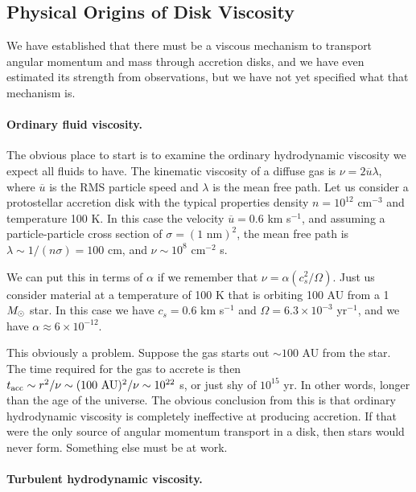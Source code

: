 \subsection{Physical Origins of Disk Viscosity}

We have established that there must be a viscous mechanism to transport angular momentum and mass through accretion disks, and we have even estimated its strength from observations, but we have not yet specified what that mechanism is.

\paragraph{Ordinary fluid viscosity.}

The obvious place to start is to examine the ordinary hydrodynamic viscosity we expect all fluids to have. The kinematic viscosity of a diffuse gas is $\nu = 2\overline{u}\lambda$, where $\overline{u}$ is the RMS particle speed and $\lambda$ is the mean free path.
Let us consider a protostellar accretion disk with the typical properties density $n=10^{12}$ cm$^{-3}$ and temperature 100 K. In this case the velocity $\overline{u} = 0.6$ km s$^{-1}$, and assuming a particle-particle cross section of $\sigma=(1\mbox{ nm})^2$, the mean free path is $\lambda \sim 1/(n\sigma)=100$ cm, and $\nu \sim 10^8$ cm$^{-2}$ s.

We can put this in terms of $\alpha$ if we remember that $\nu = \alpha (c_s^2/\Omega)$. Just us consider material at a temperature of 100 K that is orbiting 100 AU from a 1 $M_{\odot}$ star. In this case we have $c_s = 0.6$ km s$^{-1}$ and $\Omega = 6.3\times 10^{-3}$ yr$^{-1}$, and we have $\alpha \approx 6\times 10^{-12}$.

This obviously a problem. Suppose the gas starts out $\sim 100$ AU from the star. The time required for the gas to accrete is then $t_{\rm acc}\sim r^2/\nu \sim (100\mbox{ AU})^2/\nu \sim 10^{22}$ s, or just shy of $10^{15}$ yr. In other words, longer than the age of the universe. The obvious conclusion from this is that ordinary hydrodynamic viscosity is completely ineffective at producing accretion. If that were the only source of angular momentum transport in a disk, then stars would never form. Something else must be at work.

\paragraph{Turbulent hydrodynamic viscosity.}

